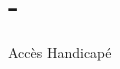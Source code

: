\hypertarget{--example}{}\section{-\/}
Accès Handicapé


\begin{DoxyCodeInclude}
\end{DoxyCodeInclude}
 